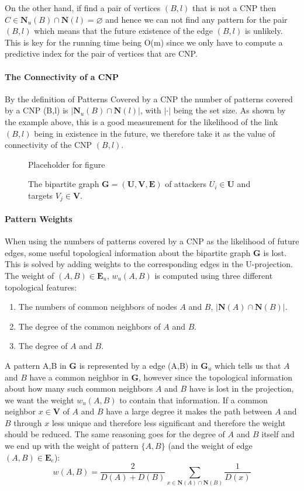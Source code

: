On the other hand, if find a pair of vertices $(B,l)$ that is not a CNP then $C\in\textbf{N}_u(B)\cap\textbf{N}(l) = \varnothing$ and hence we can not find any pattern for the pair $(B,l)$ which means that the future existence of the edge $(B,l)$ is unlikely. This is key for the running time being O(m) since we only have to compute a predictive index for the pair of vertices that are CNP.

\paragraph{The Connectivity of a CNP}
By the definition of Patterns Covered by a CNP the number of patterns covered by a CNP (B,l) is $|\textbf{N}_u(B)\cap\textbf{N}(l)|$, with $|\cdot|$ being the set size. As shown by the example above, this is a good measurement for the likelihood of the link $(B,l)$ being in existence in the future, we therefore take it as the value of connectivity of the CNP $(B,l)$.

\begin{figure}[!ht]
\centering
Placeholder for figure
\vspace{5cm}
\caption{\label{fig:cnp} The bipartite graph $\textbf{G}=(\textbf{U},\textbf{V},\textbf{E})$ of attackers $U_i\in\textbf{U}$ and targets $V_j\in\textbf{V}$.}
\end{figure}

\paragraph{Pattern Weights}
When using the numbers of patterns covered by a CNP as the likelihood of future edges, some useful topological information about the bipartite graph $\textbf{G}$ is lost. This is solved by adding weights to the corresponding edges in the U-projection. The weight of $(A,B)\in\textbf{E}_u$, $w_u(A,B)$ is computed using three different topological features:
\begin{enumerate}
\item The numbers of common neighbors of nodes $A$ and $B$, $|\textbf{N}(A)\cap\textbf{N}(B)|$.
\item The degree of the common neighbors of $A$ and $B$.
\item The degree of $A$ and $B$.
\end{enumerate}
A pattern {A,B} in $\textbf{G}$ is represented by a edge (A,B) in $\textbf{G}_u$ which tells us that $A$ and $B$ have a common neighbor in $\textbf{G}$, however since the topological information about how many such common neighbors $A$ and $B$ have is lost in the projection, we want the weight $w_u(A,B)$ to contain that information. If a common neighbor $x\in\textbf{V}$ of $A$ and $B$ have a large degree it makes the path between $A$ and $B$ through $x$ less unique and therefore less significant and therefore the weight should be reduced. The same reasoning goes for the degree of $A$ and $B$ itself and we end up with the weight of pattern $\{A,B\}$ (and the weight of edge $(A,B)\in\textbf{E}_e$):
$$
    w(A,B) = \frac{2}{D(A)+D(B)} \sum_{x\in\textbf{N}(A)\cap\textbf{N}(B)} \frac{1}{D(x)}
$$

